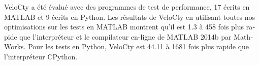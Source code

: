 \begin{otherlanguage}{french}
VeloCty a été évalué avec des programmes de test de performance, 17 écrits en MATLAB et 9 écrits en Python.                              
Les résultats de VeloCty en utilisant toutes nos optimisations sur les                              
tests en MATLAB montrent qu'il est 1.3 à 458 fois plus rapide que                                   
l'interpréteur et le compilateur en-ligne de MATLAB 2014b par                                       
MathWorks.  Pour les tests en Python, VeloCty est 44.11 à 1681 fois                                 
plus rapide que l'interpréteur CPython. 
\end{otherlanguage}

